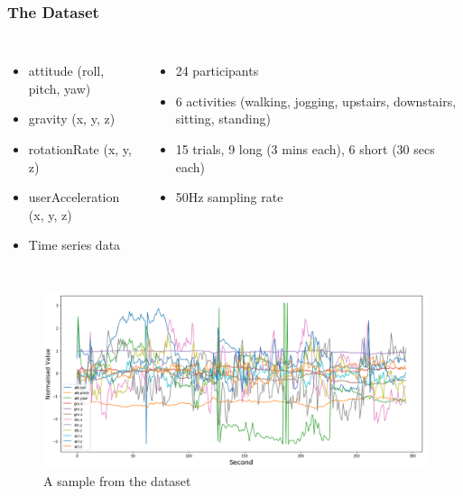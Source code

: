 \documentclass[
	11pt, %
]{beamer}
\begin{document}
\begin{frame}
	\frametitle{The Dataset \cite{motionsense}}

    \begin{columns}
            \begin{itemize}
            \item attitude (roll, pitch, yaw)
            \item gravity (x, y, z)
            \item rotationRate (x, y, z)
            \item userAcceleration (x, y, z)
            \item Time series data
            \end{itemize}

            \begin{itemize}
                \item 24 participants
                \item 6 activities (walking, jogging, upstairs, downstairs, sitting, standing)
                \item 15 trials, 9 long (3 mins each), 6 short (30 secs each)
                \item 50Hz sampling rate
            \end{itemize}
    \end{columns}
	
    \begin{figure}[]
        \includegraphics[width=0.5\linewidth]{dataset.png}
        \caption{A sample from the dataset \cite{dataset:online} }
    \end{figure}
\end{frame}
\end{document}
